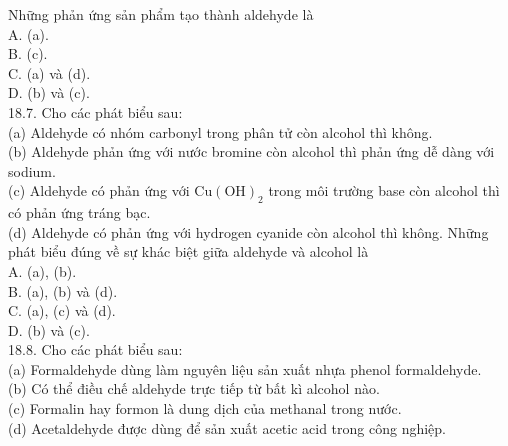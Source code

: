 \documentclass[10pt]{article}
\begin{document}
Những phản ứng sản phẩm tạo thành aldehyde là\\
A. (a).\\
B. (c).\\
C. (a) và (d).\\
D. (b) và (c).\\
18.7. Cho các phát biểu sau:\\
(a) Aldehyde có nhóm carbonyl trong phân tử còn alcohol thì không.\\
(b) Aldehyde phản ứng với nước bromine còn alcohol thì phản ứng dễ dàng với sodium.\\
(c) Aldehyde có phản ứng với $\mathrm{Cu}(\mathrm{OH})_{2}$ trong môi trường base còn alcohol thì có phản ứng tráng bạc.\\
(d) Aldehyde có phản ứng với hydrogen cyanide còn alcohol thì không. Những phát biểu đúng về sự khác biệt giữa aldehyde và alcohol là\\
A. (a), (b).\\
B. (a), (b) và (d).\\
C. (a), (c) và (d).\\
D. (b) và (c).\\
18.8. Cho các phát biểu sau:\\
(a) Formaldehyde dùng làm nguyên liệu sản xuất nhựa phenol formaldehyde.\\
(b) Có thể điều chế aldehyde trực tiếp từ bất kì alcohol nào.\\
(c) Formalin hay formon là dung dịch của methanal trong nước.\\
(d) Acetaldehyde được dùng để sản xuất acetic acid trong công nghiệp.
\end{document}
